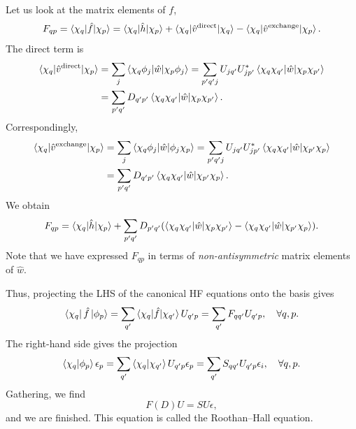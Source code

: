 \documentclass{report}
\theoremstyle{plain}
\theoremstyle{definition}
\begin{document}

Let us look at the matrix elements of ${f}$,
\begin{equation}
  {F}_{qp} = \braket{\chi_q|\hat{f}|\chi_p} =
  \braket{\chi_q|\hat{h}|\chi_p} +
  \braket{\chi_q|\hat{v}^\text{direct}|\chi_q} -
  \braket{\chi_q|\hat{v}^\text{exchange}|\chi_p}.
\end{equation}
The direct term is
\begin{equation}
  \begin{split}
  \braket{\chi_q|\hat{v}^\text{direct}|\chi_p} &=\sum_j
  \braket{\chi_q\phi_j|\hat{w}|\chi_p\phi_j} = \sum_{p'q' j} U_{jq'}
  U_{jp'}^*  \braket{\chi_q\chi_{q'}|\hat{w}|\chi_p \chi_{p'}} \\
  & = \sum_{p'q'} D_{q'p'} \braket{\chi_q \chi_{q'}|\hat{w}|\chi_{p} \chi_{p'}}.
\end{split}
\end{equation}
Correspondingly,
\begin{equation}
  \begin{split}
  \braket{\chi_q|\hat{v}^\text{exchange}|\chi_p} &=\sum_j
  \braket{\chi_q\phi_j|\hat{w}|\phi_j\chi_p} = \sum_{p'q' j} U_{jq'}
  U_{jp'}^*  \braket{\chi_q\chi_{q'}|\hat{w}|\chi_{p'}\chi_p} \\
  & = \sum_{p'q'} D_{q'p'} \braket{\chi_q \chi_{q'}|\hat{w}|\chi_{p'} \chi_{p}}.
\end{split}
\end{equation}
We obtain
\begin{equation}
  F_{qp} = \braket{\chi_q|\hat{h}|\chi_p} + \sum_{p'q'} D_{p'q'} (\braket{\chi_q \chi_{q'}|\hat{w}|\chi_{p} \chi_{p'}}
  - \braket{\chi_q \chi_{q'}|\hat{w}|\chi_{p'} \chi_{p}}).
\end{equation}
Note that we have expressed $F_{qp}$ in terms of
\emph{non-antisymmetric} matrix elements of $\hat{w}$.

Thus, projecting the LHS of the canonical HF equations onto the basis gives
\begin{equation}
  \bra{\chi_q } \hat{f} \ket{\phi_p} = \sum_{q'}
  \braket{\chi_q|\hat{f}|\chi_{q'}} U_{q'p} = \sum_{q'} F_{qq'} U_{q'p}, \quad
  \forall q,p.
\end{equation}
The right-hand side gives the projection
\begin{equation}
  \braket{\chi_q|\phi_p}\epsilon_p = \sum_{q'}
  \braket{\chi_q|\chi_{q'}}U_{q'p}\epsilon_p = \sum_{q'} S_{qq'} U_{q'p}
  \epsilon_i, \quad \forall q,p.
\end{equation}
Gathering, we find
\begin{equation}
  F(D) U = S U \epsilon, \label{eq:roothan-hall}
\end{equation}
and we are finished. This equation is called the Roothan--Hall
equation.
\end{document}
